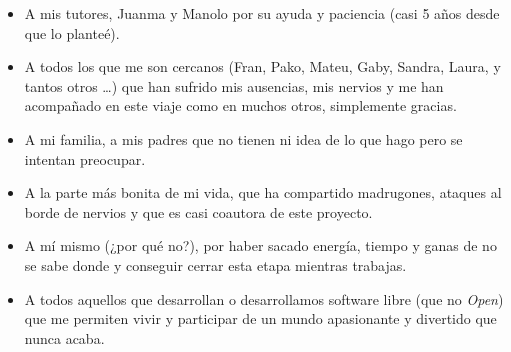 \thispagestyle{empty}

\begin{center}
  \begin{flushright}
    \begin{itemize}
      \item A mis tutores, Juanma y Manolo por su ayuda y paciencia (casi 5 años desde que lo planteé).
      \item A todos los que me son cercanos (Fran, Pako, Mateu, Gaby, Sandra, Laura, y tantos otros \ldots) que han sufrido mis ausencias, mis nervios y me han acompañado
      en este viaje como en muchos otros, simplemente gracias.
      \item A mi familia, a mis padres que no tienen ni idea de lo que hago pero se intentan preocupar.
      \item A la parte más bonita de mi vida, que ha compartido madrugones, ataques al borde de nervios y que es casi coautora de este proyecto.
      \item A mí mismo (¿por qué no?), por haber sacado energía, tiempo y ganas de no se sabe donde y conseguir cerrar esta etapa mientras
      trabajas.
      \item A todos aquellos que desarrollan o desarrollamos software libre (que no \emph{Open}) que me permiten vivir y participar de un mundo apasionante y divertido
      que nunca acaba.
    \end{itemize}

  \end{flushright}
\end{center}


